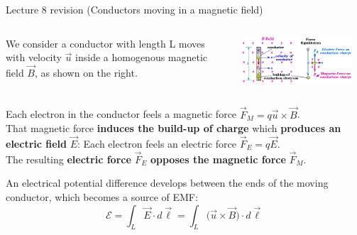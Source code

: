 
\renewcommand{\summarizedlecture}{8 }


%
%
%

\begin{frame}{Lecture \summarizedlecture revision (Conductors moving in a magnetic field)}

\begin{columns}
  \begin{column}{0.50\textwidth}
     We consider a conductor with length L moves with velocity $\vec{u}$ inside a
     homogenous magnetic field $\vec{B}$, as shown on the right.
  \end{column}
  \begin{column}{0.50\textwidth}
   \begin{center}
     \includegraphics[width=0.90\textwidth]{./images/schematics/conductor_in_magnetic_field_induced_emf.png}\\
   \end{center}
  \end{column}
\end{columns}

\vspace{0.2cm}

Each electron in the conductor feels a magnetic force $\vec{F}_{M} = q \vec{u} \times \vec{B}$.\\
\vspace{0.1cm}
That magnetic force {\bf induces the build-up of charge}
which {\bf produces an electric field} $\vec{E}$:
Each electron feels an electric force $\vec{F}_{E} = q \vec{E}$.\\
\vspace{0.2cm}
The resulting {\bf electric force} $\vec{F}_{E}$ {\bf opposes the magnetic force} $\vec{F}_{M}$.\\

\vspace{0.2cm}

An electrical potential difference develops between the ends of the moving conductor,
which becomes a source of EMF:
\begin{equation*}
   \mathcal{E} = \int_{L} \vec{E} \cdot d\vec{\ell} = \int_{L} \Big( \vec{u} \times \vec{B} \Big) \cdot d\vec{\ell}
\end{equation*}

\end{frame}

